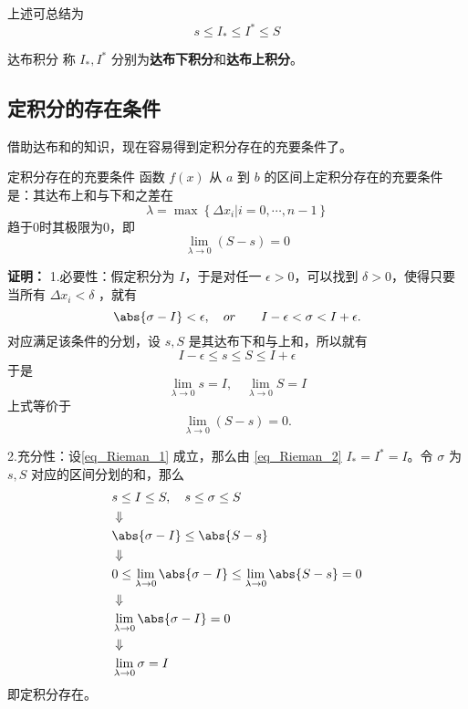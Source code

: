 上述可总结为
\begin{equation}\label{eq_Rieman_2}
s\leq I_*\leq I^*\leq S
\end{equation}
\begin{definition}{达布积分}
称 $I_*,I^*$ 分别为\textbf{达布下积分}和\textbf{达布上积分}。
\end{definition}

\subsection{定积分的存在条件}

借助达布和的知识，现在容易得到定积分存在的充要条件了。
\begin{theorem}{定积分存在的充要条件}
函数 $f(x)$ 从 $a$ 到 $b$ 的区间上定积分存在的充要条件是：其达布上和与下和之差在
\begin{equation}
\lambda=\max \left\{\Delta x_i|i=0,\cdots,n-1 \right\} 
\end{equation}
趋于0时其极限为0，即
\begin{equation}\label{eq_Rieman_1}
\lim_{\lambda\rightarrow0}(S-s)=0
\end{equation}
\end{theorem}
\textbf{证明：}
1.必要性：假定积分为 $I$，于是对任一 $\epsilon>0$，可以找到 $\delta>0$，使得只要 当所有 $\Delta x_i<\delta$ ，就有
\begin{equation}
\abs{\sigma-I}<\epsilon,\quad or \qquad I-\epsilon<\sigma<I+\epsilon.
\end{equation}
对应满足该条件的分划，设 $s,S$ 是其达布下和与上和，所以就有
\begin{equation}
I-\epsilon\leq s\leq S\leq I+\epsilon
\end{equation}
于是
\begin{equation}
\lim_{\lambda\rightarrow0}s=I,\quad \lim_{\lambda\rightarrow0}S=I
\end{equation}
上式等价于
\begin{equation}
\lim_{\lambda\rightarrow0}(S-s)=0.
\end{equation}

2.充分性：设\autoref{eq_Rieman_1} 成立，那么由 \autoref{eq_Rieman_2}  $I_*=I^*=I$。令 $\sigma$ 为 $s,S$ 对应的区间分划的和，那么
\begin{equation}
\begin{aligned}
&s\leq I\leq S,\quad s\leq \sigma\leq S\\
&\Downarrow\\
&\abs{\sigma-I}\leq\abs{S-s}\\
&\Downarrow\\
&0\leq\lim_{\lambda\rightarrow0}\abs{\sigma-I}\leq\lim_{\lambda\rightarrow0}\abs{S-s}=0\\
&\Downarrow\\
&\lim_{\lambda\rightarrow0}\abs{\sigma-I}=0\\
&\Downarrow\\
&\lim_{\lambda\rightarrow0}\sigma=I
\end{aligned}
\end{equation}
即定积分存在。

